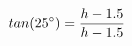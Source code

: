 \documentclass[preview]{standalone}
\begin{document}
\begin{align*}
tan( 25^{\circ} ) =  {{h  -  1.5  } \over   {{h  -  1.5  }}}
\end{align*}
\end{document}

